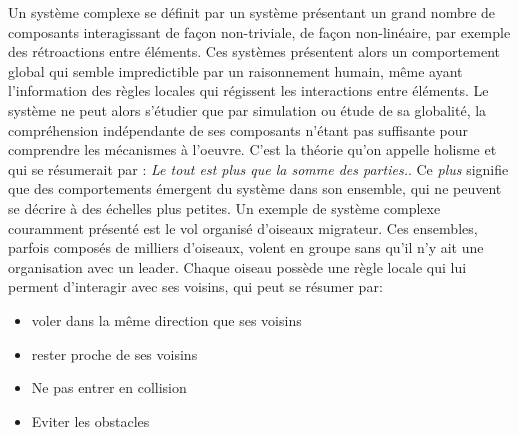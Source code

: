 Un système complexe se définit par un système présentant un grand nombre de composants interagissant de façon non-triviale, de façon non-linéaire, par exemple des rétroactions entre éléments. Ces systèmes présentent alors un comportement global qui semble impredictible par un raisonnement humain, même ayant l'information des règles locales qui régissent les interactions entre éléments. Le système ne peut alors s'étudier que par simulation ou étude de sa globalité, la compréhension indépendante de ses composants n'étant pas suffisante pour comprendre les mécanismes à l'oeuvre. C'est la théorie qu'on appelle holisme et qui se résumerait par : \emph{Le tout est plus que la somme des parties.}. Ce \emph{plus} signifie que des comportements émergent du système dans son ensemble, qui ne peuvent se décrire à des échelles plus petites. Un exemple de système complexe couramment présenté est le vol organisé d'oiseaux migrateur. Ces ensembles, parfois composés de milliers d'oiseaux, volent en groupe sans qu'il n'y ait une organisation avec un leader. Chaque oiseau possède une règle locale qui lui perment d'interagir avec ses voisins, qui peut se résumer par: 

\begin{itemize}
\item voler dans la même direction que ses voisins
\item rester proche de ses voisins
\item Ne pas entrer en collision
\item Eviter les obstacles
\end{itemize}

